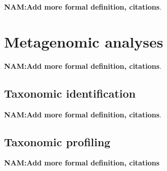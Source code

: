 \textbf{NAM:Add more formal definition, citations}.
\section{Metagenomic analyses}\label{back:metagenomic}

\textbf{NAM:Add more formal definition, citations}.
\subsection{Taxonomic identification}\label{back:taxonomic_id}

\textbf{NAM:Add more formal definition, citations}.
\subsection{Taxonomic profiling}\label{back:taxonomic_profiling}

\textbf{NAM:Add more formal definition, citations}
